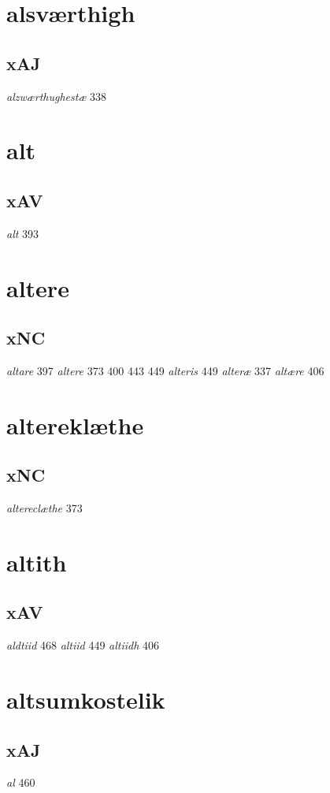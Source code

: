 \documentclass[a4paper,twocolumn]{article}
\begin{document}
\section{alsværthigh}
\label{sec:orgcb008c1}
\subsection{xAJ}
\label{sec:orgc9c9954}
\emph{alzwærthughestæ} 338 
\section{alt}
\label{sec:org1e8a728}
\subsection{xAV}
\label{sec:org863afef}
\emph{alt} 393 
\section{altere}
\label{sec:org196bf89}
\subsection{xNC}
\label{sec:orga654d80}
\emph{altare} 397 \emph{altere} 373 400 443 449 \emph{alteris} 449 \emph{alteræ} 337 \emph{altære} 406 
\section{altereklæthe}
\label{sec:orgad7c9d9}
\subsection{xNC}
\label{sec:orgd4775e9}
\emph{altereclæthe} 373 
\section{altith}
\label{sec:orgb44e252}
\subsection{xAV}
\label{sec:org3e54262}
\emph{aldtiid} 468 \emph{altiid} 449 \emph{altiidh} 406 
\section{altsumkostelik}
\label{sec:org5c3c29c}
\subsection{xAJ}
\label{sec:org2a5c645}
\emph{al} 460 
\end{document}
